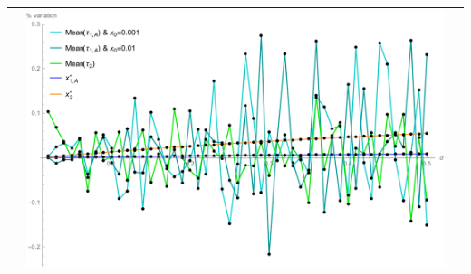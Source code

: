\begin{table}[!htb]
\begin{tabular}{c|c|c}
\begin{minipage}{.45\textwidth}
		\end{minipage}
		& \begin{minipage}{.45\textwidth}
			\includegraphics[width=\linewidth]{StopTime/3_var.pdf}
		\end{minipage} \\ \hline
	\end{tabular}
\label{res2}
\end{table}


